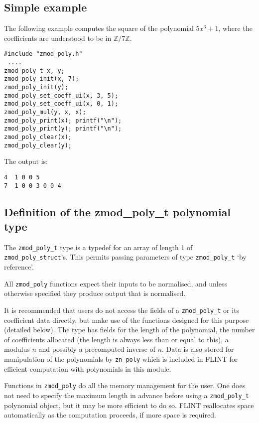 \documentclass[a4paper,10pt]{article}
\newcommand{\Z}{\mathbb{Z}}
\newcommand{\code}{\lstinline}
\begin{document}
\subsection{Simple example}

The following example computes the square of the polynomial $5x^3 + 1$, where the coefficients are understood to be in $\Z/7\Z$.

\begin{lstlisting}
#include "zmod_poly.h"
 ....
zmod_poly_t x, y;
zmod_poly_init(x, 7);
zmod_poly_init(y);
zmod_poly_set_coeff_ui(x, 3, 5);
zmod_poly_set_coeff_ui(x, 0, 1);
zmod_poly_mul(y, x, x);
zmod_poly_print(x); printf("\n");
zmod_poly_print(y); printf("\n");
zmod_poly_clear(x);
zmod_poly_clear(y);
\end{lstlisting}

The output is:

\begin{lstlisting}
4  1 0 0 5
7  1 0 0 3 0 0 4
\end{lstlisting}

\subsection{Definition of the zmod\_poly\_t polynomial type}

The \code{zmod_poly_t} type is a typedef for an array of length 1 of \code{zmod_poly_struct}'s. This permits passing parameters  of type \code{zmod_poly_t} `by reference'. 

All \code{zmod_poly} functions expect their inputs to be normalised, and unless otherwise specified they produce output that is normalised. 

It is recommended that users do not access the fields of a \code{zmod_poly_t} or its coefficient data directly, but make use of the functions designed for this purpose (detailed below). The type has fields for the length of the polynomial, the number of coefficients allocated (the length is always less than or equal to this), a modulus $n$ and possibly a precomputed inverse of $n$. Data is also stored for manipulation of the polynomials by \code{zn_poly} which is included in FLINT for efficient computation with polynomials in this module.

Functions in \code{zmod_poly} do all the memory management for the user. One does not need to specify the maximum length in advance before using a \code{zmod_poly_t} polynomial object, but it may be more efficient to do so. FLINT reallocates space automatically as the computation proceeds, if more space is required. 
\end{document}

